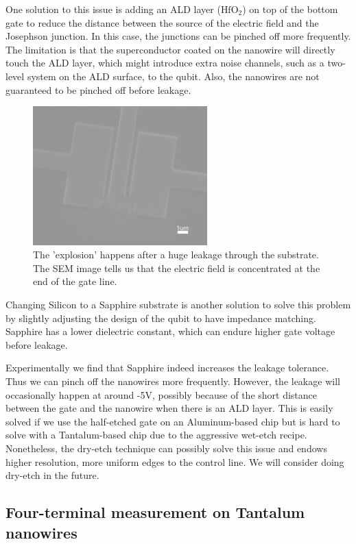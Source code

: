 One solution to this issue is adding an ALD layer ($\text{HfO}_2$) on top of the bottom gate to reduce the distance between the source of the electric field and the Josephson junction. In this case, the junctions can be pinched off more frequently. The limitation is that the superconductor coated on the nanowire will directly touch the ALD layer, which might introduce extra noise channels, such as a two-level system on the ALD surface, to the qubit. Also, the nanowires are not guaranteed to be pinched off before leakage. 
\begin{figure}[h!]
    \centering
    \includegraphics[width=0.6\textwidth]{Pic/GateTest.jpg}
    \caption{The 'explosion' happens after a huge leakage through the substrate. The SEM image tells us that the electric field is concentrated at the end of the gate line.}
    \label{fig:my_label}
\end{figure}

Changing Silicon to a Sapphire substrate is another solution to solve this problem by slightly adjusting the design of the qubit to have impedance matching. Sapphire has a lower dielectric constant, which can endure higher gate voltage before leakage. 

Experimentally we find that Sapphire indeed increases the leakage tolerance. Thus we can pinch off the nanowires more frequently. However, the leakage will occasionally happen at around -5V, possibly because of the short distance between the gate and the nanowire when there is an ALD layer. This is easily solved if we use the half-etched gate on an Aluminum-based chip but is hard to solve with a Tantalum-based chip due to the aggressive wet-etch recipe. Nonetheless, the dry-etch technique can possibly solve this issue and endows higher resolution, more uniform edges to the control line. We will consider doing dry-etch in the future.

\subsection{Four-terminal measurement on Tantalum nanowires}

